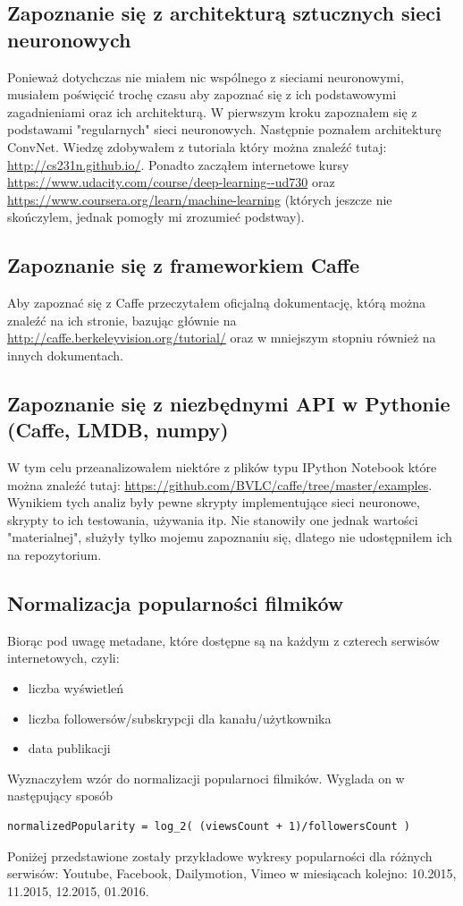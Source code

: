 \documentclass{article}
\begin{document}
\subsection{Zapoznanie się z architekturą sztucznych sieci neuronowych}
Ponieważ dotychczas nie miałem nic wspólnego z sieciami neuronowymi, musiałem poświęcić trochę czasu aby zapoznać się z ich podstawowymi zagadnieniami oraz ich architekturą. W pierwszym kroku zapoznałem się z podstawami "regularnych" sieci neuronowych. Następnie poznałem architekturę ConvNet. Wiedzę zdobywałem z tutoriala który można znaleźć tutaj: \url{http://cs231n.github.io/}. Ponadto zacząłem internetowe kursy \url{https://www.udacity.com/course/deep-learning--ud730} oraz \url{https://www.coursera.org/learn/machine-learning} (których jeszcze nie skończylem, jednak pomogły mi zrozumieć podstway).


\subsection{Zapoznanie się z frameworkiem Caffe}
Aby zapoznać się z Caffe przeczytałem oficjalną dokumentację, którą można znaleźć na ich stronie, bazując głównie na \url{http://caffe.berkeleyvision.org/tutorial/} oraz w mniejszym stopniu również na innych dokumentach.

\subsection{Zapoznanie się z niezbędnymi API w Pythonie (Caffe, LMDB, numpy)}
W tym celu przeanalizowałem niektóre z plików typu IPython Notebook które można znaleźć tutaj:  \url{https://github.com/BVLC/caffe/tree/master/examples}. Wynikiem tych analiz były pewne skrypty implementujące sieci neuronowe, skrypty to ich testowania, używania itp. Nie stanowiły one jednak wartości "materialnej", służyły tylko mojemu zapoznaniu się, dlatego nie udostępniłem ich na repozytorium.

\subsection{Normalizacja popularności filmików}
Biorąc pod uwagę metadane, które dostępne są na każdym z czterech serwisów internetowych, czyli:
\begin{itemize}
    \item liczba wyświetleń
    \item liczba followersów/subskrypcji dla kanału/użytkownika
    \item data publikacji
\end{itemize}
Wyznaczyłem wzór do normalizacji popularnoci filmików. Wyglada on w następujący sposób
\begin{Verbatim}
normalizedPopularity = log_2( (viewsCount + 1)/followersCount )
\end{Verbatim} 
Poniżej przedstawione zostały przykładowe wykresy popularności dla różnych serwisów: Youtube, Facebook, Dailymotion, Vimeo w miesiącach kolejno: 10.2015, 11.2015, 12.2015, 01.2016.
\end{document}
